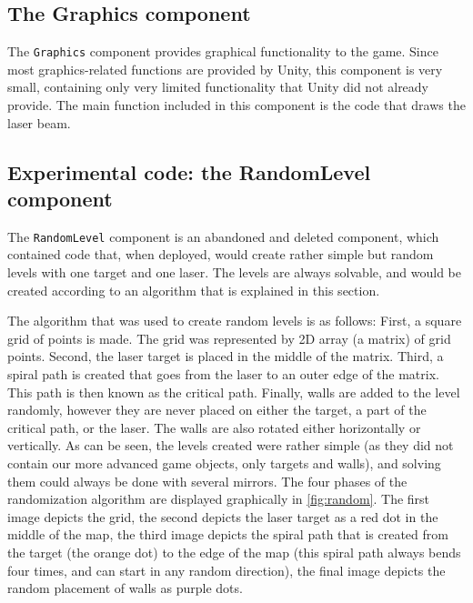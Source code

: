 		\subsection{The Graphics component}
			The \texttt{Graphics} component provides graphical functionality to 
            the game. Since most graphics-related functions are provided by 
            Unity, this component is very small, containing only very limited 
            functionality that Unity did not already provide. The main 
            function included in this component is the code that draws the laser 
            beam. 

\subsection{Experimental code: the RandomLevel component} \label{ssec:randomlevelcomponent}
			The \texttt{RandomLevel} component is an abandoned and deleted
			component, which contained code that, when deployed, would create
			rather simple but random levels with one target and one laser.
			The levels are always solvable, and would be created according 
			to an algorithm that is explained in this section.
			
			The algorithm that was used to create random levels is as follows:
			First, a square grid of points is made. The grid was represented by
			2D array (a matrix) of grid points. Second, the laser target is
			placed in the middle of the matrix. Third, a spiral path is created that
			goes from the laser to an outer edge of the matrix. This path is then
			known as the critical path. Finally, walls are added to the level randomly,
			however they are never placed on either the target, a part of the
			critical path, or the laser. The walls are also rotated either
			horizontally or vertically. As can be seen, the levels created were
			rather simple (as they did not contain our more advanced game
			objects, only targets and walls), and solving them could always be done
			with several mirrors. The four phases of the randomization algorithm
			are displayed graphically in \ref{fig:random}. The first image depicts
			the grid, the second depicts the laser target as a red dot in the
			middle of the map, the third image depicts the spiral path that
			is created from the target (the orange dot) to the edge of the map 
			(this spiral path always bends four times, and can start in any 
			random direction), the final image depicts the random placement of
			walls as purple dots.
			
